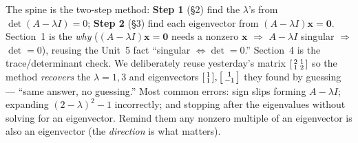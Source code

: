 \documentclass[10pt]{article}
\newcommand{\xx}{\mathbf{x}}
\newcommand{\zero}{\mathbf{0}}
\begin{document}
\begin{teachernote}
The spine is the two-step method: \textbf{Step 1} (§2) find the $\lambda$'s from
$\det(A-\lambda I)=0$; \textbf{Step 2} (§3) find each eigenvector from $(A-\lambda I)\xx=\zero$.
Section~1 is the \emph{why} ($(A-\lambda I)\xx=\zero$ needs a nonzero $\xx$ $\Rightarrow$ $A-\lambda I$
singular $\Rightarrow$ $\det=0$), reusing the Unit~5 fact ``singular $\Leftrightarrow\det=0$.''
Section~4 is the trace/determinant check. We deliberately reuse yesterday's matrix
$\begin{bsmallmatrix}2&1\\1&2\end{bsmallmatrix}$ so the method \emph{recovers} the $\lambda=1,3$ and
eigenvectors $\begin{bsmallmatrix}1\\1\end{bsmallmatrix},\begin{bsmallmatrix}1\\-1\end{bsmallmatrix}$
they found by guessing --- ``same answer, no guessing.'' Most common errors: sign slips forming
$A-\lambda I$; expanding $(2-\lambda)^2-1$ incorrectly; and stopping after the eigenvalues without
solving for an eigenvector. Remind them any nonzero multiple of an eigenvector is also an eigenvector
(the \emph{direction} is what matters).
\end{teachernote}
\end{document}
